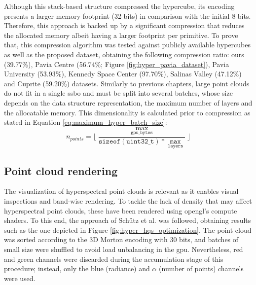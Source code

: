 Although this stack-based structure compressed the hypercube, its encoding presents a larger memory footprint (32 bits) in comparison with the initial 8 bits. Therefore, this approach is backed up by a significant compression that reduces the allocated memory albeit having a larger footprint per primitive. To prove that, this compression algorithm was tested against publicly available hypercubes \cite{noauthor_hyperspectral_nodate} as well as the proposed dataset, obtaining the following compression ratio: ours (39.77\%), Pavia Centre (56.74\%; Figure \ref{fig:hyper_pavia_dataset}), Pavia University (53.93\%), Kennedy Space Center (97.70\%), Salinas Valley (47.12\%) and Cuprite (59.20\%) datasets. Similarly to previous chapters, large point clouds do not fit in a single \acrshort{ssbo} and must be split into several batches, whose size depends on the data structure representation, the maximum number of layers and the allocatable memory. This dimensionality is calculated prior to compression as stated in Equation \ref{eq:maximum_hyper_batch_size}:
\begin{equation}
    n_{\textit{points}} = \lfloor{\frac{\max_{\mathtt{gpu\_bytes}}}{\mathtt{sizeof(uint32\_t)} * \mathtt{\max_{\mathtt{layers}}}}\rfloor}
    \label{eq:maximum_hyper_batch_size}
\end{equation}

\subsection{Point cloud rendering}

The visualization of hyperspectral point clouds is relevant as it enables visual inspections and band-wise rendering. To tackle the lack of density that may affect hyperspectral point clouds, these have been rendered using \acrshort{opengl}'s compute shaders. To this end, the approach of Schütz et al. \cite{schutz_rendering_2021} was followed, obtaining results such as the one depicted in Figure \ref{fig:hyper_hqs_optimization}. The point cloud was sorted according to the 3D Morton encoding with 30 bits, and batches of small size were shuffled to avoid load unbalancing in the \acrshort{gpu}. Nevertheless, red and green channels were discarded during the accumulation stage of this procedure; instead, only the blue (radiance) and $\alpha$ (number of points) channels were used. 

